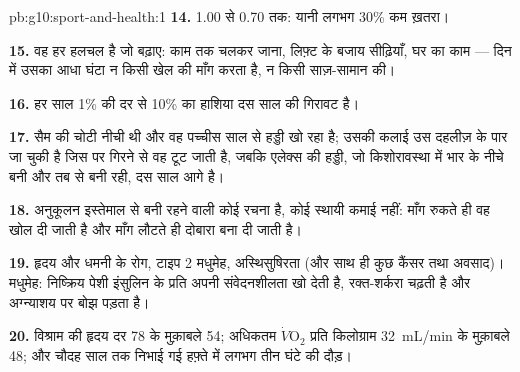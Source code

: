 \begin{solution}{pb:g10:sport-and-health:1}
\textbf{14.} 1.00 से 0.70 तक: यानी लगभग 30\% कम ख़तरा।

\textbf{15.}  वह हर हलचल है जो  बढ़ाए: काम तक
चलकर जाना, लिफ़्ट के बजाय सीढ़ियाँ, घर का काम --- दिन में उसका आधा घंटा न
किसी खेल की माँग करता है, न किसी साज़-सामान की।

\textbf{16.} हर साल 1\% की दर से 10\% का हाशिया दस साल की गिरावट है।

\textbf{17.} सैम की चोटी नीची थी और वह पच्चीस साल से हड्डी खो रहा है;
उसकी कलाई उस दहलीज़ के पार जा चुकी है जिस पर गिरने से वह टूट जाती है,
जबकि एलेक्स की हड्डी, जो किशोरावस्था में भार के नीचे बनी और तब से बनी रही,
दस साल आगे है।

\textbf{18.} अनुकूलन इस्तेमाल से बनी रहने वाली कोई रचना है, कोई स्थायी
कमाई नहीं: माँग रुकते ही वह खोल दी जाती है और माँग लौटते ही दोबारा बना दी
जाती है।

\textbf{19.} हृदय और धमनी के रोग, टाइप 2 मधुमेह, अस्थिसुषिरता (और साथ ही
कुछ कैंसर तथा अवसाद)। मधुमेह: निष्क्रिय पेशी इंसुलिन के प्रति अपनी
संवेदनशीलता खो देती है, रक्त-शर्करा चढ़ती है और अग्न्याशय पर बोझ पड़ता
है।

\textbf{20.} विश्राम की हृदय दर 78 के मुक़ाबले 54; अधिकतम
$\dot V\!\mathrm{O_2}$ प्रति किलोग्राम \qty{32}{mL/min} के मुक़ाबले
\num{48}; और चौदह साल तक निभाई गई हफ़्ते में लगभग तीन घंटे की दौड़।
\end{solution}
